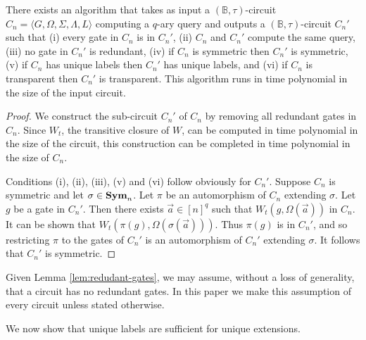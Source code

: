 \documentclass[../paper.tex]{subfiles}
\begin{document}
\begin{lem}
  There exists an algorithm that takes as input a $(\mathbb{B}, \tau)$-circuit
  $C_n = \langle G, \Omega, \Sigma, \Lambda, L \rangle$ computing a $q$-ary
  query and outputs a $(\mathbb{B}, \tau)$-circuit $C_n'$ such that (i) every
  gate in $C_n$ is in $C_n'$, (ii) $C_n$ and $C_n'$ compute the same query,
  (iii) no gate in $C_n'$ is redundant, (iv) if $C_n$ is symmetric then $C_n'$
  is symmetric, (v) if $C_n$ has unique labels then $C_n'$ has unique labels,
  and (vi) if $C_n$ is transparent then $C_n'$ is transparent. This algorithm
  runs in time polynomial in the size of the input circuit.
  \label{lem:redudant-gates}
\end{lem}
\begin{proof}
  We construct the sub-circuit $C_n'$ of $C_n$ by removing all redundant gates
  in $C_n$. Since $W_t$, the transitive closure of $W$, can be computed in time
  polynomial in the size of the circuit, this construction can be completed in
  time polynomial in the size of $C_n$.

  Conditions (i), (ii), (iii), (v) and (vi) follow obviously for $C_n'$. Suppose
  $C_n$ is symmetric and let $\sigma \in \text{\textbf{Sym}}_n$. Let $\pi$ be an automorphism
  of $C_n$ extending $\sigma$. Let $g$ be a gate in $C_n'$. Then there exists
  $\vec{a} \in [n]^q$ such that $W_t(g, \Omega(\vec{a}))$ in $C_n$. It can be
  shown that $W_t (\pi(g), \Omega(\sigma(\vec{a})))$. Thus $\pi (g)$ is in
  $C_n'$, and so restricting $\pi$ to the gates of $C_n'$ is an automorphism of
  $C_n'$ extending $\sigma$. It follows that $C_n'$ is symmetric.
\end{proof}

Given Lemma \ref{lem:redudant-gates}, we may assume, without a loss of
generality, that a circuit has no redundant gates. In this paper we make this
assumption of every circuit unless stated otherwise.

We now show that unique labels are sufficient for unique extensions.
\end{document}

